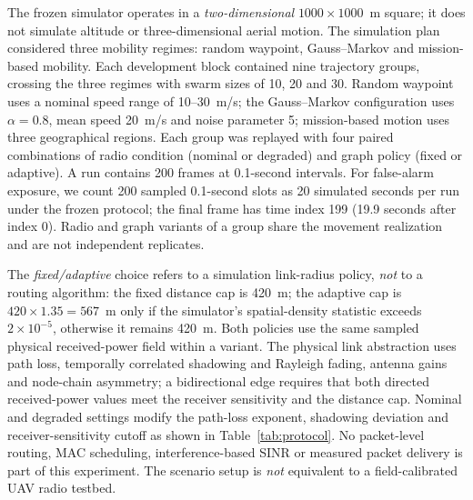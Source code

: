 \documentclass[10pt,a4paper]{article}
\begin{document}
The frozen simulator operates in a \emph{two-dimensional} $1000\times1000$~m square; it does not simulate altitude or three-dimensional aerial motion. The simulation plan considered three mobility regimes: random waypoint, Gauss--Markov and mission-based mobility. Each development block contained nine trajectory groups, crossing the three regimes with swarm sizes of 10, 20 and 30. Random waypoint uses a nominal speed range of 10--30~m/s; the Gauss--Markov configuration uses $\alpha=0.8$, mean speed 20~m/s and noise parameter 5; mission-based motion uses three geographical regions. Each group was replayed with four paired combinations of radio condition (nominal or degraded) and graph policy (fixed or adaptive). A run contains 200 frames at 0.1-second intervals. For false-alarm exposure, we count 200 sampled 0.1-second slots as 20 simulated seconds per run under the frozen protocol; the final frame has time index 199 (19.9 seconds after index 0). Radio and graph variants of a group share the movement realization and are not independent replicates.

The \emph{fixed/adaptive} choice refers to a simulation link-radius policy, \emph{not} to a routing algorithm: the fixed distance cap is 420~m; the adaptive cap is $420\times1.35=567$~m only if the simulator's spatial-density statistic exceeds $2\times10^{-5}$, otherwise it remains 420~m. Both policies use the same sampled physical received-power field within a variant. The physical link abstraction uses path loss, temporally correlated shadowing and Rayleigh fading, antenna gains and node-chain asymmetry; a bidirectional edge requires that both directed received-power values meet the receiver sensitivity and the distance cap. Nominal and degraded settings modify the path-loss exponent, shadowing deviation and receiver-sensitivity cutoff as shown in Table~\ref{tab:protocol}. No packet-level routing, MAC scheduling, interference-based SINR or measured packet delivery is part of this experiment. The scenario setup is \emph{not} equivalent to a field-calibrated UAV radio testbed.
\end{document}
